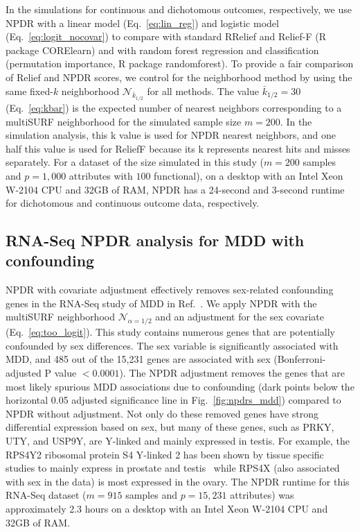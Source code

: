 \documentclass{bioinfo}
\begin{document}
In the simulations for continuous and dichotomous outcomes, respectively, we use NPDR with a linear model (Eq.~\ref{eq:lin_reg}) and logistic model (Eq.~\ref{eq:logit_nocovar}) to compare with standard RRelief and Relief-F (R package CORElearn) and with random forest regression and classification (permutation importance, R package randomforest).
To provide a fair comparison of Relief and NPDR scores, we control for the neighborhood method by using the same fixed-$k$ neighborhood $\mathcal{N}_{\bar{k}_{1/2}}$ for all methods.
The value $\bar{k}_{1/2}=30$ (Eq.~\ref{eq:kbar}) is the expected number of nearest neighbors corresponding to a multiSURF neighborhood for the simulated sample size $m=200$. %
In the simulation analysis, this k value is used for NPDR nearest neighbors, and one half this value is used for ReliefF because its k represents nearest hits and misses separately.
For a dataset of the size simulated in this study ($m = 200$ samples and $p = 1,000$ attributes with $100$ functional), on a desktop with an Intel Xeon W-2104 CPU and 32GB of RAM, NPDR has a 24-second and 3-second runtime for dichotomous and continuous outcome data, respectively.

\subsection{RNA-Seq NPDR analysis for MDD with confounding}
NPDR with covariate adjustment effectively removes sex-related confounding genes in the RNA-Seq study of MDD in Ref.~\citep{mostafavi14}.
We apply NPDR with the multiSURF neighborhood $\mathcal{N}_{\alpha=1/2}$ and an adjustment for the sex covariate (Eq.~\ref{eq:too_logit}).
This study contains numerous genes that are potentially confounded by sex differences.
The sex variable is significantly associated with MDD, and 485 out of the 15,231 genes are associated with sex (Bonferroni-adjusted P value $<0.0001$).
The NPDR adjustment removes the genes that are most likely spurious MDD associations due to confounding (dark points below the horizontal 0.05 adjusted significance line in Fig.~\ref{fig:npdrs_mdd}) compared to NPDR without adjustment.
Not only do these removed genes have strong differential expression based on sex, but many of these genes, such as PRKY, UTY, and USP9Y, are Y-linked and mainly expressed in testis.
For example, the RPS4Y2 ribosomal protein S4 Y-linked 2 has been shown by tissue specific studies to mainly express in prostate and testis~\citep{lopes2010human} while RPS4X (also associated with sex in the data) is most expressed in the ovary.
The NPDR runtime for this RNA-Seq dataset ($m=915$ samples and $p=15,231$ attributes) was approximately 2.3 hours on a desktop with an Intel Xeon W-2104 CPU and 32GB of RAM.
\end{document}
